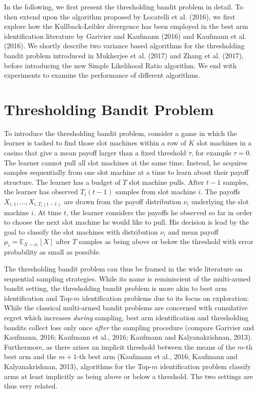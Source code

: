 \documentclass[12pt,]{article}
\begin{document}
In the following, we first present the thresholding bandit problem in
detail. To then extend upon the algorithm proposed by Locatelli et al.
(2016), we first explore how the Kullback-Leibler divergence has been
employed in the best arm identification literature by Garivier and
Kaufmann (2016) and Kaufmann et al. (2016). We shortly describe two
variance based algorithms for the thresholding bandit problem introduced
in Mukherjee et al. (2017) and Zhang et al. (2017), before introducing
the new Simple Likelihood Ratio algorithm. We end with experiments to
examine the performance of different algorithms.

\newpage

\section{\texorpdfstring{Thresholding Bandit Problem
\label{chap:ThresholdingBanditProblem}}{Thresholding Bandit Problem }}\label{thresholding-bandit-problem}

To introduce the thresholding bandit problem, consider a game in which
the learner is tasked to find those slot machines within a row of \(K\)
slot machines in a casino that give a mean payoff larger than a fixed
threshold \(\tau\), for example \(\tau = 0\). The learner cannot pull
all slot machines at the same time. Instead, he acquires samples
sequentially from one slot machine at a time to learn about their payoff
structure. The learner has a budget of \(T\) slot machine pulls. After
\(t-1\) samples, the learner has observed \(T_i(t-1)\) samples from slot
machine \(i\). The payoffs \(X_{i,1}, ..., X_{i,T_i(t-1)}\) are drawn
from the payoff distribution \(\nu_i\) underlying the slot machine
\(i\). At time \(t\), the learner considers the payoffs he observed so
far in order to choose the next slot machine he would like to pull. His
decision is lead by the goal to classify the slot machines with
distribution \(\nu_i\) and mean payoff
\(\mu_i = \mathbb{E}_{X \sim \nu_i}[X]\) after \(T\) samples as being
above or below the threshold with error probability as small as
possible.

The thresholding bandit problem can thus be framed in the wide
literature on sequential sampling strategies. While its name is
reminiscient of the multi-armed bandit setting, the thresholding bandit
problem is more akin to best arm identification and Top-\(m\)
identification problems due to its focus on exploration: While the
classical multi-armed bandit problems are concerned with cumulative
regret which increases \emph{during} sampling, best arm identification
and thresholding bandits collect loss only once \emph{after} the
sampling procedure (compare Garivier and Kaufmann, 2016; Kaufmann et
al., 2016; Kaufmann and Kalyanakrishnan, 2013). Furthermore, as there
arises an implicit threshold between the means of the \(m\)-th best arm
and the \(m+1\)-th best arm (Kaufmann et al., 2016; Kaufmann and
Kalyanakrishnan, 2013), algorithms for the Top-\(m\) identification
problem classify arms at least implicitly as being above or below a
threshold. The two settings are thus very related.
\end{document}
